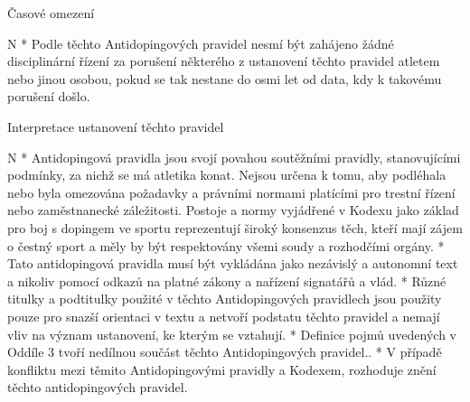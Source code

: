 \secc Časové omezení

\begitems \style N
* Podle těchto Antidopingových pravidel nesmí být zahájeno žádné disciplinární řízení za porušení některého z ustanovení těchto pravidel atletem nebo jinou osobou, pokud se tak nestane do osmi let od data, kdy k takovému porušení došlo.
\enditems

\secc Interpretace ustanovení těchto pravidel

\begitems \style N
* Antidopingová pravidla jsou svojí povahou soutěžními pravidly, stanovujícími podmínky, za nichž se má atletika konat. Nejsou určena k tomu, aby podléhala nebo byla omezována požadavky a právními normami platícími pro trestní řízení nebo zaměstnanecké záležitosti. Postoje a normy vyjádřené v Kodexu jako základ pro boj s dopingem ve sportu reprezentují široký konsenzus těch, kteří mají zájem o čestný sport a měly by být respektovány všemi soudy a rozhodčími orgány.
* Tato antidopingová pravidla musí být vykládána jako nezávislý a autonomní text a nikoliv pomocí odkazů na platné zákony a nařízení signatářů a vlád.
* Různé titulky a podtitulky použité v těchto Antidopingových pravidlech jsou použity pouze pro snazší orientaci v textu a netvoří podstatu těchto pravidel a nemají vliv na význam ustanovení, ke kterým se vztahují.
* Definice pojmů uvedených v Oddíle 3 tvoří nedílnou součást těchto Antidopingových pravidel..
* V případě konfliktu mezi těmito Antidopingovými pravidly a Kodexem, rozhoduje znění těchto antidopingových pravidel.
\enditems

\endinput